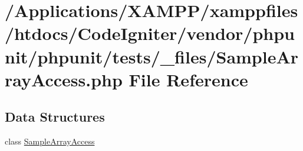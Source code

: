 \hypertarget{_sample_array_access_8php}{}\section{/\+Applications/\+X\+A\+M\+P\+P/xamppfiles/htdocs/\+Code\+Igniter/vendor/phpunit/phpunit/tests/\+\_\+files/\+Sample\+Array\+Access.php File Reference}
\label{_sample_array_access_8php}
\subsection*{Data Structures}
\begin{DoxyCompactItemize}
\item 
class \mbox{\hyperlink{class_sample_array_access}{Sample\+Array\+Access}}
\end{DoxyCompactItemize}
